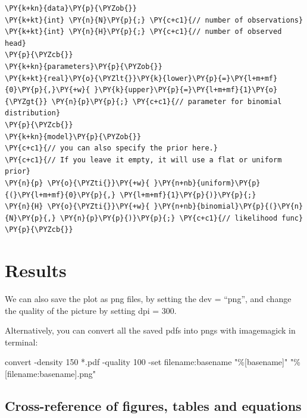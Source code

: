 \documentclass[
  letterpaper,
  DIV=11,
  numbers=noendperiod]{scrartcl}
\newenvironment{Shaded}{\begin{snugshade}}{\end{snugshade}}
\newcommand{\AttributeTok}[1]{\textcolor[rgb]{0.40,0.45,0.13}{#1}}
\newcommand{\ExtensionTok}[1]{\textcolor[rgb]{0.00,0.23,0.31}{#1}}
\newcommand{\NormalTok}[1]{\textcolor[rgb]{0.00,0.23,0.31}{#1}}
\newcommand{\PreprocessorTok}[1]{\textcolor[rgb]{0.68,0.00,0.00}{#1}}
\newcommand{\StringTok}[1]{\textcolor[rgb]{0.13,0.47,0.30}{#1}}
\begin{document}
\begin{Shaded}
\begin{Verbatim}[commandchars=\\\{\}]
\PY{k+kn}{data}\PY{p}{\PYZob{}}
\PY{k+kt}{int} \PY{n}{N}\PY{p}{;} \PY{c+c1}{// number of observations}
\PY{k+kt}{int} \PY{n}{H}\PY{p}{;} \PY{c+c1}{// number of observed head}
\PY{p}{\PYZcb{}}
\PY{k+kn}{parameters}\PY{p}{\PYZob{}}
\PY{k+kt}{real}\PY{o}{\PYZlt{}}\PY{k}{lower}\PY{p}{=}\PY{l+m+mf}{0}\PY{p}{,}\PY{+w}{ }\PY{k}{upper}\PY{p}{=}\PY{l+m+mf}{1}\PY{o}{\PYZgt{}} \PY{n}{p}\PY{p}{;} \PY{c+c1}{// parameter for binomial distribution}
\PY{p}{\PYZcb{}}
\PY{k+kn}{model}\PY{p}{\PYZob{}}
\PY{c+c1}{// you can also specify the prior here.}
\PY{c+c1}{// If you leave it empty, it will use a flat or uniform prior}
\PY{n}{p} \PY{o}{\PYZti{}}\PY{+w}{ }\PY{n+nb}{uniform}\PY{p}{(}\PY{l+m+mf}{0}\PY{p}{,} \PY{l+m+mf}{1}\PY{p}{)}\PY{p}{;}
\PY{n}{H} \PY{o}{\PYZti{}}\PY{+w}{ }\PY{n+nb}{binomial}\PY{p}{(}\PY{n}{N}\PY{p}{,} \PY{n}{p}\PY{p}{)}\PY{p}{;} \PY{c+c1}{// likelihood func}
\PY{p}{\PYZcb{}}
\end{Verbatim}
\end{Shaded}

\hypertarget{results}{%
\section{Results}\label{results}}

We can also save the plot as png files, by setting the dev = ``png'',
and change the quality of the picture by setting dpi = 300.

Alternatively, you can convert all the saved pdfs into pngs with
imagemagick in terminal:

\begin{Shaded}
\begin{Highlighting}[]
\ExtensionTok{convert} \AttributeTok{{-}density}\NormalTok{ 150 }\PreprocessorTok{*}\NormalTok{.pdf }\AttributeTok{{-}quality}\NormalTok{ 100 }\AttributeTok{{-}set}\NormalTok{ filename:basename }\StringTok{"\%[basename]"} \StringTok{"\%[filename:basename].png"}
\end{Highlighting}
\end{Shaded}

\hypertarget{cross-reference-of-figures-tables-and-equations}{%
\subsection{Cross-reference of figures, tables and
equations}\label{cross-reference-of-figures-tables-and-equations}}
\end{document}
